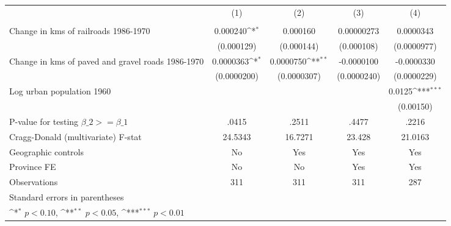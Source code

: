 {
\def\sym#1{\ifmmode^{#1}\else\(^{#1}\)\fi}
\begin{tabular}{l*{4}{c}}
\hline\hline
                &\multicolumn{1}{c}{(1)}&\multicolumn{1}{c}{(2)}&\multicolumn{1}{c}{(3)}&\multicolumn{1}{c}{(4)}\\
                &\multicolumn{1}{c}{}&\multicolumn{1}{c}{}&\multicolumn{1}{c}{}&\multicolumn{1}{c}{}\\
\hline
Change in kms of railroads 1986-1970& 0.000240\sym{*}  & 0.000160         &0.00000273         &0.0000343         \\
                &(0.000129)         &(0.000144)         &(0.000108)         &(0.0000977)         \\
[1em]
Change in kms of paved and gravel roads 1986-1970&0.0000363\sym{*}  &0.0000750\sym{**} &-0.0000100         &-0.0000330         \\
                &(0.0000200)         &(0.0000307)         &(0.0000240)         &(0.0000229)         \\
[1em]
Log urban population 1960&                  &                  &                  &   0.0125\sym{***}\\
                &                  &                  &                  &(0.00150)         \\
\hline
P-value for testing $\beta\_{2} >= \beta\_{1}$&    .0415         &    .2511         &    .4477         &    .2216         \\
Cragg-Donald (multivariate) F-stat&  24.5343         &  16.7271         &   23.428         &  21.0163         \\
Geographic controls&       No         &      Yes         &      Yes         &      Yes         \\
Province FE     &       No         &       No         &      Yes         &      Yes         \\
Observations    &      311         &      311         &      311         &      287         \\
\hline\hline
\multicolumn{5}{l}{\footnotesize Standard errors in parentheses}\\
\multicolumn{5}{l}{\footnotesize \sym{*} \(p<0.10\), \sym{**} \(p<0.05\), \sym{***} \(p<0.01\)}\\
\end{tabular}
}
